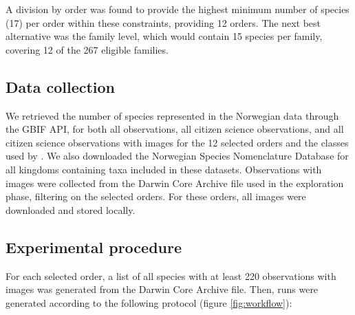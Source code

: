 \documentclass{article}
\begin{document}
A division by order was found to provide the highest minimum number of species (17) per order within these constraints, providing 12 orders. The next best alternative was the family level, which would contain 15 species per family, covering 12 of the 267 eligible families.

\subsection*{Data collection}
We retrieved the number of species represented in the Norwegian data through the GBIF API, for both all observations, all citizen science observations, and all citizen science observations with images for the 12 selected orders and the classes used by \citeauthor{Troudet2017}\autocite{Troudet2017}. We also downloaded the Norwegian Species Nomenclature Database for all kingdoms containing taxa included in these datasets. Observations with images were collected from the Darwin Core Archive file used in the exploration phase, filtering on the selected orders. For these orders, all images were downloaded and stored locally.

\subsection*{Experimental procedure}
For each selected order, a list of all species with at least 220 observations with images was generated from the Darwin Core Archive file\autocite{GBIF_dataset}. Then, runs were generated according to the following protocol (figure \ref{fig:workflow}):
\end{document}
